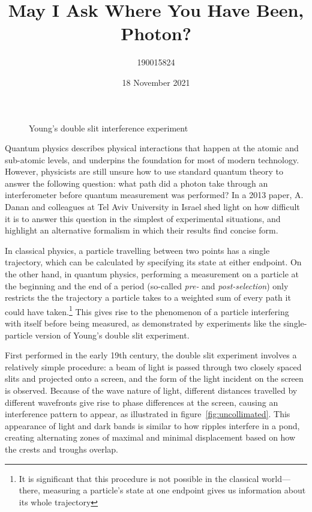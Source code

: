 \documentclass{article}
\author{190015824}
\title{May I Ask Where You Have Been, Photon?}
\date{18 November 2021}
\begin{document}
\maketitle

\begin{figure}[ht]
	\centering
	\hspace*{\fill}
	\caption{Young's double slit interference experiment}
	\label{fig:double-slit}
\end{figure}

Quantum physics describes physical interactions that happen at the atomic and
sub-atomic levels, and underpins the foundation for most of modern technology.
However, physicists are still unsure how to use standard quantum theory to 
answer the following question: what path did a photon take through an 
interferometer before quantum measurement was performed? In a 2013 paper,
A. Danan and colleagues at Tel Aviv University in Israel shed light on how 
difficult it is to answer this question in the simplest of experimental 
situations, and highlight an alternative formalism in which their results find 
concise form\cite{danan}. 

In classical physics, a particle travelling between two points has a single
trajectory, which can be calculated by specifying its state at either endpoint.  
On the other hand, in quantum physics, performing a measurement on a particle 
at the beginning and the end of a period (so-called \textit{pre-} and 
\textit{post-selection}) only restricts the the trajectory a particle takes to 
a weighted sum of every path it could have 
taken\cite{aharonov2008}.\footnote{It is significant that this procedure is not 
possible in the classical world---there, measuring a particle's state at one 
endpoint gives us information about its whole trajectory} This gives rise to 
the phenomenon of a particle interfering with itself before being measured, as 
demonstrated by experiments like the single-particle version of Young's double 
slit experiment\cite{feynman}. 

First performed in the early 19th century, the double slit experiment involves 
a relatively simple procedure: a beam of light is passed through two closely 
spaced slits and projected onto a screen, and the form of the light incident on 
the screen is observed\cite{feynman}. Because of the wave nature of light, 
different distances travelled by different wavefronts give rise to phase 
differences at the screen, causing an interference pattern to appear, as 
illustrated in figure~\ref{fig:uncollimated}. This appearance of light and dark 
bands is similar to how ripples interfere in a pond, creating alternating zones 
of maximal and minimal displacement based on how the crests and troughs 
overlap.
\end{document}
